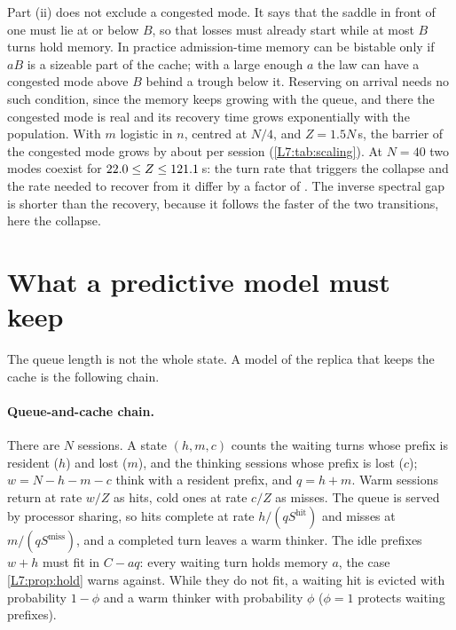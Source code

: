 Part (ii) does not exclude a congested mode. It says that the saddle in front of one
must lie at or below $B$, so that losses must already start while at most $B$ turns hold
memory. In practice admission-time memory can be bistable only if $aB$ is a sizeable
part of the cache; with a large enough $a$ the law can have a congested mode above $B$
behind a trough below it. Reserving on arrival needs no such condition, since the memory
keeps growing with the queue, and there the congested mode is real and its recovery time
grows exponentially with the population. With $m$ logistic in $n$, centred at
$N/4$, and $Z=1.5N$\,s, the barrier of the congested mode grows by about \metaScalingSlope{} per
session (\cref{L7:tab:scaling}). At $N=40$ two modes coexist for
$22.0\le Z\le121.1$\,s: the turn rate that triggers the collapse and the
rate needed to recover from it differ by a factor of \metaHysRatio. The inverse spectral
gap is shorter than the recovery, because it follows the faster of the two transitions,
here the collapse.

\begin{table}[h]\centering\small
\metaScalingTable
\caption{Closed queue, $Z=1.5N$, logistic $m$ centred at $N/4$: barrier from the
congested mode to the saddle, mean recovery time to the empty queue
(\cref{L7:lem:bd}(ii)), and the inverse spectral gap.}\label{L7:tab:scaling}
\end{table}

\section{What a predictive model must keep}\label{L7:sec:enough}

The queue length is not the whole state. A model of the replica that keeps the cache is
the following chain.

\paragraph{Queue-and-cache chain.}\label{L7:def:three} There are $N$ sessions. A state $(h,m,c)$ counts the waiting turns whose prefix is resident ($h$)
and lost ($m$), and the thinking sessions whose prefix is lost ($c$); $w=N-h-m-c$ think
with a resident prefix, and $q=h+m$. Warm sessions return at rate $w/Z$ as hits, cold
ones at rate $c/Z$ as misses. The queue is served by processor sharing, so hits complete
at rate $h/(qS^{\mathrm{hit}})$ and misses at $m/(qS^{\mathrm{miss}})$, and a completed
turn leaves a warm thinker. The idle prefixes $w+h$ must fit in $C-aq$: every waiting turn
holds memory $a$, the case \cref{L7:prop:hold} warns against. While they do not fit, a
waiting hit is evicted with probability $1-\phi$ and a warm thinker with probability $\phi$
($\phi=1$ protects waiting prefixes).

